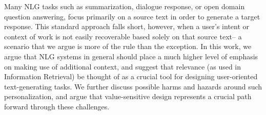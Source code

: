 Many NLG tasks such as summarization, dialogue response, or open domain question answering, focus primarily on a source text in order to generate a target response. This standard approach falls short, however, when a user's intent or context of work is not easily recoverable based solely on that source text-- a scenario that we argue is more of the rule than the exception. In this work, we argue that NLG systems in general should place a much higher level of emphasis on making use of additional context, and suggest that relevance (as used in Information Retrieval) be thought of as a crucial tool for designing user-oriented text-generating tasks. We further discuss possible harms and hazards around such personalization, and argue that value-sensitive design represents a crucial path forward through these challenges.

